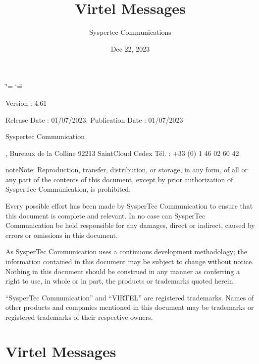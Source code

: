 \documentclass[letterpaper,10pt,english]{sphinxmanual}
\title{Virtel Messages}
\date{Dec 22, 2023}
\author{Syspertec Communications}
\begin{document}
\ifdefined\shorthandoff
  \ifnum\catcode`\=\string=\active\shorthandoff{=}\fi
  \ifnum\catcode`\"=\active{}\fi
\fi

\pagestyle{empty}
\sphinxmaketitle
\pagestyle{plain}
\sphinxtableofcontents
\pagestyle{normal}
\label{\detokenize{messages::doc}}


\sphinxAtStartPar
{}

\sphinxAtStartPar
{}

\sphinxAtStartPar
Version : 4.61

\sphinxAtStartPar
Release Date : 01/07/2023. Publication Date : 01/07/2023

\sphinxAtStartPar
Syspertec Communication

, Bureaux de la Colline 92213 Saint\sphinxhyphen{}Cloud Cedex Tél. : +33 (0) 1 46 02 60 42

\sphinxAtStartPar
{}

\begin{sphinxadmonition}{note}{Note:}
\sphinxAtStartPar
Reproduction, transfer, distribution, or storage, in any form, of all or any part of
the contents of this document, except by prior authorization of SysperTec
Communication, is prohibited.

\sphinxAtStartPar
Every possible effort has been made by SysperTec Communication to ensure that this document
is complete and relevant. In no case can SysperTec Communication be held responsible for
any damages, direct or indirect, caused by errors or omissions in this document.

\sphinxAtStartPar
As SysperTec Communication uses a continuous development methodology; the information
contained in this document may be subject to change without notice. Nothing in this
document should be construed in any manner as conferring a right to use, in whole or in
part, the products or trademarks quoted herein.

\sphinxAtStartPar
“SysperTec Communication” and “VIRTEL” are registered trademarks. Names of other products
and companies mentioned in this document may be trademarks or registered trademarks of
their respective owners.
\end{sphinxadmonition}


\chapter{Virtel Messages}
\label{\detokenize{messages:virtel-messages}}\label{\detokenize{messages:v461mg-introduction}}
\end{document}
